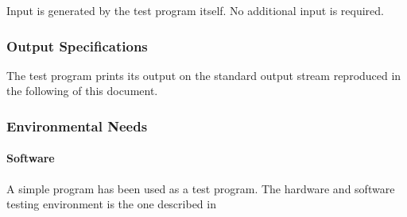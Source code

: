 Input is generated by the test program itself. No additional input is required.

\subsubsection{Output Specifications}

The test program prints its output on the
standard output stream reproduced in the following of this document. 

\subsubsection{Environmental Needs}




\paragraph{Software}

A simple program has been used as a test program. The hardware and software
testing environment is the one described in 




